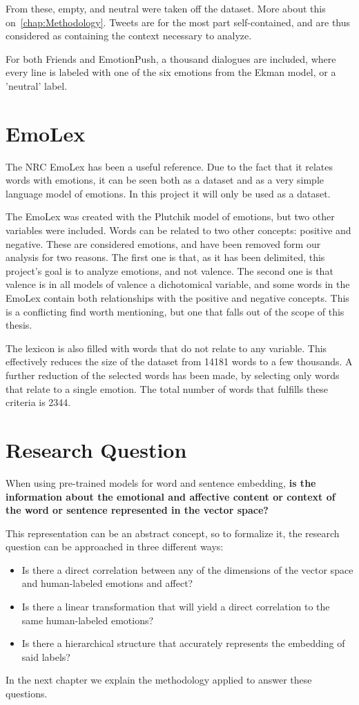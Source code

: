 From these, empty, and neutral were taken off the dataset. More about this on~\ref{chap:Methodology}. Tweets are for the most part self-contained, and are thus considered as containing the context necessary to analyze.

For both Friends and EmotionPush, a thousand dialogues are included, where every line is labeled with one of the six emotions from the Ekman model, or a 'neutral' label.

\section{EmoLex}\label{sec:Research Question}
The NRC EmoLex has been a useful reference. Due to the fact that it relates words with emotions, it can be seen both as a dataset and as a very simple language model of emotions. In this project it will only be used as a dataset.

The EmoLex was created with the Plutchik model of emotions, but two other variables were included. Words can be related to two other concepts: positive and negative. These are considered emotions, and have been removed form our analysis for two reasons. The first one is that, as it has been delimited, this project's goal is to analyze emotions, and not valence. The second one is that valence is in all models of valence a dichotomical variable, and some words in the EmoLex contain both relationships with the positive and negative concepts. This is a conflicting find worth mentioning, but one that falls out of the scope of this thesis.

The lexicon is also filled with words that do not relate to any variable. This effectively reduces the size of the dataset from 14181 words to a few thousands. A further reduction of the selected words has been made, by selecting only words that relate to a single emotion. The total number of words that fulfills these criteria is 2344.

\section{Research Question}\label{sec:Research Question}
When using pre-trained models for word and sentence embedding, \textbf{is the information about the emotional and affective content or context of the word or sentence represented in the vector space?}

This representation can be an abstract concept, so to formalize it, the research question can be approached in three different ways:

\begin{itemize}
  \item Is there a direct correlation between any of the dimensions of the vector space and human-labeled emotions and affect?
  \item Is there a linear transformation that will yield a direct correlation to the same human-labeled emotions?
  \item Is there a hierarchical structure that accurately represents the embedding of said labels?
\end{itemize}

In the next chapter we explain the methodology applied to answer these questions.
